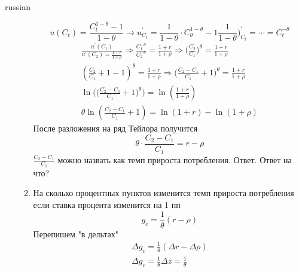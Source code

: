 \documentclass{article}
\begin{document}
\begin{otherlanguage*}{russian}
\begin{enumerate}
\begin{enumerate}
\begin{equation}
u(C_t)  = \frac{C^{1 - \theta}_t - 1}{1 - \theta} \rightarrow u^{'}_{C_t} = \frac{1}{1 - \theta} \cdot C^{1 - \theta}_\theta - 1 \frac{1}{1 - \theta})^{'}_{C_t} = \cdots = C_t^{- \theta} 
\end{equation}
\begin{align}
\frac{u^{'}(C_1)}{u^{'}(C_2) = \frac{1 + r}{1 + \rho}} \Rightarrow \frac{C_1^{-\theta}}{C_2^{-\theta}} = \frac{1 + r}{1 + \rho} \Rightarrow \Big( \frac{C_2}{C_1}\Big)^\theta = \frac{1 + r}{1 + \rho} \\
(\frac{C_2}{C_1} + 1 - 1)^\theta = \frac{1 + r}{1 + \rho} \Rightarrow \Big( \frac{C_2 - C_1}{C_1} + 1 \Big)^\theta = \frac{1 + r}{1 + \rho} \\
\ln \Big(\Big( \frac{C_2 - C_1}{C_1} + 1 \Big)^\theta \Big)= \ln (\frac{1 + r}{1 + \rho}) \\
\theta \ln (\frac{C_2 - C_1}{C_1} + 1) = \ln ( 1+ r) - \ln (1 + \rho) 
\end{align}
После разложения на ряд Тейлора получится 
\begin{equation}
\theta \cdot \frac{C_2 - C_1}{C_1} = r - \rho 
\end{equation}
$ \frac{C_2 - C_1}{C_1} $ можно назвать как темп прироста потребления. Ответ. Ответ на что? 
\item На сколько процентных пунктов изменится темп прироста потребления если ставка процента изменится на 1 пп 
\begin{equation}
g_c = \frac{1}{\theta} (r - \rho ) 
\end{equation}
Перепишем "в дельтах"
\begin{align}
\Delta g_c = \frac{1}{\theta} ( \Delta r - \Delta \rho) \\
\Delta g_c = \frac{1}{\theta} \Delta z = \frac{1}{\theta}
\end{align}
\end{enumerate}
\end{enumerate}
\end{otherlanguage*} 
\end{document}
